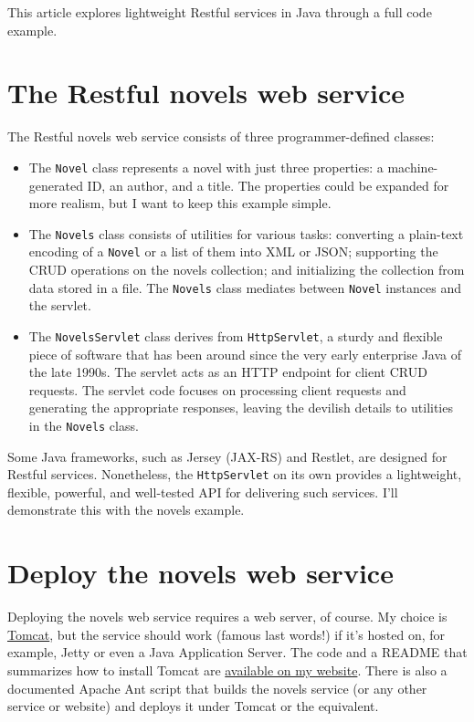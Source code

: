\documentclass[12pt]{article}
\begin{document}
This article explores lightweight Restful services in Java through a full code example.

\section{The Restful novels web service}

The Restful novels web service consists of three programmer-defined classes:

\begin{itemize}
    \item The \verb|Novel| class represents a novel with just three properties: a machine-generated ID, an author, and a title. The properties could be expanded for more realism, but I want to keep this example simple.
    \item The \verb|Novels| class consists of utilities for various tasks: converting a plain-text encoding of a \verb|Novel| or a list of them into XML or JSON; supporting the CRUD operations on the novels collection; and initializing the collection from data stored in a file. The \verb|Novels| class mediates between \verb|Novel| instances and the servlet.
    \item The \verb|NovelsServlet| class derives from \verb|HttpServlet|, a sturdy and flexible piece of software that has been around since the very early enterprise Java of the late 1990s. The servlet acts as an HTTP endpoint for client CRUD requests. The servlet code focuses on processing client requests and generating the appropriate responses, leaving the devilish details to utilities in the \verb|Novels| class.
\end{itemize}

Some Java frameworks, such as Jersey (JAX-RS) and Restlet, are designed for Restful services. Nonetheless, the \verb|HttpServlet| on its own provides a lightweight, flexible, powerful, and well-tested API for delivering such services. I'll demonstrate this with the novels example.

\section{Deploy the novels web service}

Deploying the novels web service requires a web server, of course. My choice is \href{http://tomcat.apache.org/}{Tomcat}, but the service should work (famous last words!) if it's hosted on, for example, Jetty or even a Java Application Server. The code and a README that summarizes how to install Tomcat are \href{https://condor.depaul.edu/mkalin}{available on my website}. There is also a documented Apache Ant script that builds the novels service (or any other service or website) and deploys it under Tomcat or the equivalent.\\
\end{document}
